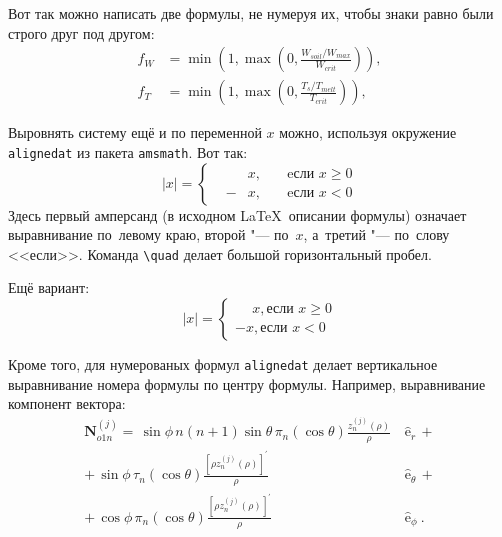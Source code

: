 Вот так можно написать две формулы, не нумеруя их, чтобы знаки равно были строго друг под другом:
\begin{align}
  f_W & =  \min \left( 1, \max \left( 0, \frac{W_{soil} / W_{max}}{W_{crit}} \right)  \right), \nonumber \\
  f_T & =  \min \left( 1, \max \left( 0, \frac{T_s / T_{melt}}{T_{crit}} \right)  \right), \nonumber
\end{align}

Выровнять систему ещё и по переменной $ x $ можно, используя окружение \verb|alignedat| из пакета \verb|amsmath|. Вот так: 
\[
    |x| = \left\{
    \begin{alignedat}{2}
        &&x, \quad &\text{eсли } x\geqslant 0 \\
        &-&x, \quad & \text{eсли } x<0
    \end{alignedat}
    \right.
\]
Здесь первый амперсанд (в исходном \LaTeX\ описании формулы) означает выравнивание по~левому краю, второй "--- по~$ x $, а~третий "--- по~слову <<если>>. Команда \verb|\quad| делает большой горизонтальный пробел.

Ещё вариант:
\[
    |x|=
    \begin{cases}
    \phantom{-}x, \text{если } x \geqslant 0 \\
    -x, \text{если } x<0
    \end{cases}
\]

Кроме того, для  нумерованых формул \verb|alignedat|  делает вертикальное
выравнивание номера формулы по центру формулы. Например,  выравнивание компонент вектора:
\begin{equation}
 \label{eq:2p3}
 \begin{alignedat}{2}
{\mathbf{N}}_{o1n}^{(j)} = \,{\sin} \phi\,n\!\left(n+1\right)
         {\sin}\theta\,
         \pi_n\!\left({\cos} \theta\right)
         \frac{
               z_n^{(j)}\!\left( \rho \right)
              }{\rho}\,
           &{\boldsymbol{\hat{\mathrm e}}}_{r}\,+   \\
+\,
{\sin} \phi\,
         \tau_n\!\left({\cos} \theta\right)
         \frac{
            \left[\rho z_n^{(j)}\!\left( \rho \right)\right]^{\prime}
              }{\rho}\,
            &{\boldsymbol{\hat{\mathrm e}}}_{\theta}\,+   \\
+\,
{\cos} \phi\,
         \pi_n\!\left({\cos} \theta\right)
         \frac{
            \left[\rho z_n^{(j)}\!\left( \rho \right)\right]^{\prime}
              }{\rho}\,
            &{\boldsymbol{\hat{\mathrm e}}}_{\phi}\:.
\end{alignedat}
\end{equation}

